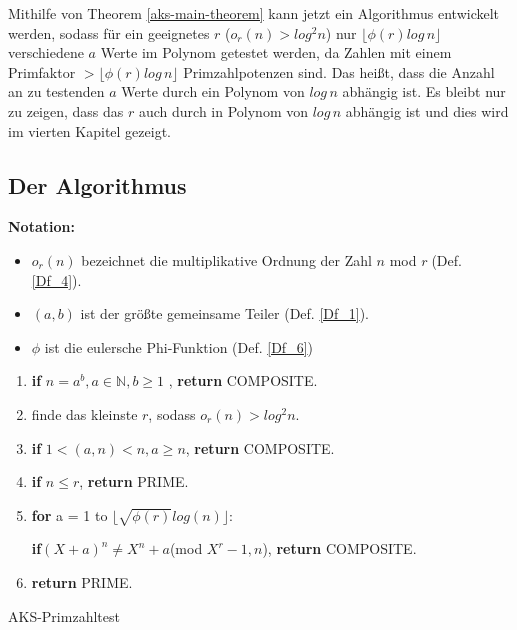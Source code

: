 \documentclass[12pt,oneside]{article}
\theoremstyle{remark}
\theoremstyle{definition}
\begin{document}
\begin{flushleft}
Mithilfe von Theorem \ref{aks-main-theorem} kann jetzt ein Algorithmus entwickelt werden, sodass für ein geeignetes $r$ ($o_{r}(n) > log^2 n$) nur $\lfloor \phi(r) log \, n \rfloor$ verschiedene $a$ Werte im Polynom getestet werden, da Zahlen mit einem Primfaktor $> \lfloor \phi(r) log \, n \rfloor$  Primzahlpotenzen sind. Das heißt, dass die Anzahl an zu testenden $a$ Werte durch ein Polynom von $log \, n$ abhängig ist. Es bleibt nur zu zeigen, dass das $r$ auch durch in Polynom von $log \, n$ abhängig ist und dies wird im vierten Kapitel gezeigt.  






\newpage

\end{flushleft}
\subsection{Der Algorithmus}\label{algo}
\textbf{Notation:}
\begin{itemize}
    \item $o_r(n)$ bezeichnet die multiplikative Ordnung der Zahl $n$ mod $r \; $(Def. \ref{Df_4}).
    \item $(a,b)$ ist der größte gemeinsame Teiler (Def. \ref{Df_1}).
\item $\phi$ ist die eulersche Phi-Funktion (Def. \ref{Df_6})  
\end{itemize}
\begin{algorithm}[H]
\SetAlgoLined
{}

\begin{enumerate}
\item \textbf{if} $n = a^b, a \in \mathbb{N}, b \geq 1$ , \textbf{return} COMPOSITE.
\item  finde das kleinste $r$, sodass $o_{r}(n) > log^2 n $.
\item \textbf{if} $1 < (a,n) < n, a \geq n $, \textbf{return} COMPOSITE.
\item \textbf{if} $n \leq r $, \textbf{return} PRIME.
\item \textbf{for} a = 1 to $\lfloor \sqrt{\phi(r)}log(n) \rfloor$:

 \textbf{if}$(X + a)^n \neq X^n + a $(mod $X^r - 1, n$), \textbf{return} COMPOSITE.
 \item \textbf{return} PRIME.
\end{enumerate}
 
\caption{AKS-Primzahltest}
\end{algorithm}
\end{document}
